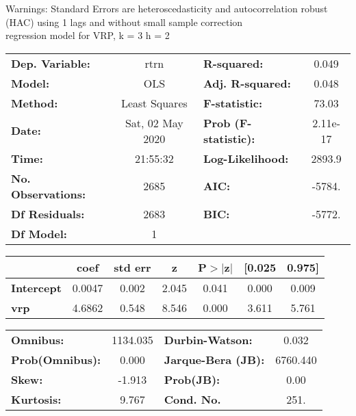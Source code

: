 Warnings: \newline
 [1] Standard Errors are heteroscedasticity and autocorrelation robust (HAC) using 1 lags and without small sample correction\\ 

regression model for VRP, k = 3 h = 2\begin{center}
\begin{tabular}{lclc}
\toprule
\textbf{Dep. Variable:}    &       rtrn       & \textbf{  R-squared:         } &     0.049   \\
\textbf{Model:}            &       OLS        & \textbf{  Adj. R-squared:    } &     0.048   \\
\textbf{Method:}           &  Least Squares   & \textbf{  F-statistic:       } &     73.03   \\
\textbf{Date:}             & Sat, 02 May 2020 & \textbf{  Prob (F-statistic):} &  2.11e-17   \\
\textbf{Time:}             &     21:55:32     & \textbf{  Log-Likelihood:    } &    2893.9   \\
\textbf{No. Observations:} &        2685      & \textbf{  AIC:               } &    -5784.   \\
\textbf{Df Residuals:}     &        2683      & \textbf{  BIC:               } &    -5772.   \\
\textbf{Df Model:}         &           1      & \textbf{                     } &             \\
\bottomrule
\end{tabular}
\begin{tabular}{lcccccc}
                   & \textbf{coef} & \textbf{std err} & \textbf{z} & \textbf{P$> |$z$|$} & \textbf{[0.025} & \textbf{0.975]}  \\
\midrule
\textbf{Intercept} &       0.0047  &        0.002     &     2.045  &         0.041        &        0.000    &        0.009     \\
\textbf{vrp}       &       4.6862  &        0.548     &     8.546  &         0.000        &        3.611    &        5.761     \\
\bottomrule
\end{tabular}
\begin{tabular}{lclc}
\textbf{Omnibus:}       & 1134.035 & \textbf{  Durbin-Watson:     } &    0.032  \\
\textbf{Prob(Omnibus):} &   0.000  & \textbf{  Jarque-Bera (JB):  } & 6760.440  \\
\textbf{Skew:}          &  -1.913  & \textbf{  Prob(JB):          } &     0.00  \\
\textbf{Kurtosis:}      &   9.767  & \textbf{  Cond. No.          } &     251.  \\
\bottomrule
\end{tabular}
\end{center}

